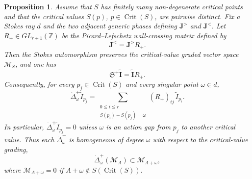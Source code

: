 \documentclass[11pt]{amsart}
\theoremstyle{plain}
\newtheorem{prop}[thm]{Proposition}
\newcommand{\Z}{\mathbb Z}
\newcommand{\Crit}{\operatorname{Crit}}
\begin{document}
\begin{prop}
\label{prop:PL-origin-pointed-alien}
Assume that \(S\) has finitely many non-degenerate critical points and that
the critical values \(S(p)\), \(p\in\Crit(S)\), are pairwise distinct.  Fix a
Stokes ray \(d\) and the two adjacent generic phases defining
\(\mathbf J^{>}\) and \(\mathbf J^{<}\).  Let
\(R_+\in GL_{r+1}(\Z)\) be the Picard--Lefschetz wall-crossing matrix defined by
\begin{equation}\label{eq:PL-matrix-R-plus}
\mathbf J^{<}=\mathbf J^{>}R_+ .
\end{equation}
Then the Stokes automorphism preserves the critical-value graded vector space
\(\mathcal M_S\), and one has
\begin{equation}\label{eq:Stokes-action-PL-matrix}
\mathfrak S^+\widetilde{\mathbf I}
=
\widetilde{\mathbf I}R_+ .
\end{equation}
Consequently, for every \(p_j\in\Crit(S)\) and every singular point
\(\omega\in d\),
\begin{equation}\label{eq:pointed-alien-action-gap-formula}
\dot\Delta_\omega^+\widetilde I_{p_j}
=
\sum_{\substack{0\le i\le r\\ S(p_i)-S(p_j)=\omega}}
(R_+)_{ij}\,\widetilde I_{p_i}.
\end{equation}
In particular, \(\dot\Delta_\omega^+\widetilde I_{p_j}=0\) unless
\(\omega\) is an action gap from \(p_j\) to another critical value.  Thus each
\(\dot\Delta_\omega^+\) is homogeneous of degree \(\omega\) with respect to
the critical-value grading,
\[
\dot\Delta_\omega^+(\mathcal M_A)\subset \mathcal M_{A+\omega},
\]
where \(\mathcal M_{A+\omega}=0\) if \(A+\omega\notin S(\Crit(S))\).
\end{prop}
\end{document}
